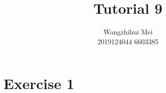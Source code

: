 \documentclass[12pt]{article}%
\begin{document}
\title{Tutorial 9}
\author{Wangzhihui Mei \\ 2019124044 6603385}
\date{}
\maketitle

\section*{Exercise 1}
\end{document}
